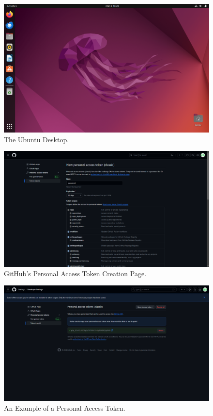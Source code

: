 \documentclass{article}
\begin{document}
\begin{figure}[p]
	\centering
	\includegraphics[width=\textwidth]{ubuntu-desktop.png}
	\caption{The Ubuntu Desktop.}
	\label{fig:ubuntu-desktop}
\end{figure}

\begin{figure}[p]
	\centering
	\includegraphics[width=\textwidth]{token.png}
	\caption{GitHub's Personal Access Token Creation Page.}
	\label{fig:token}
\end{figure}

\begin{figure}[p]
	\centering
	\includegraphics[width=\textwidth]{access-token-copy-and-paste.png}
	\caption{An Example of a Personal Access Token.}
	\label{fig:access-token-copy-and-paste}
\end{figure}
\end{document}
